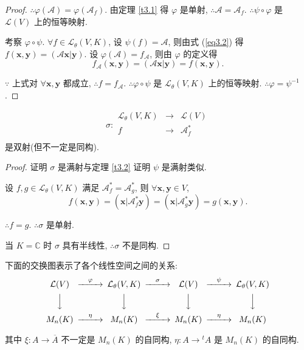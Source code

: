 \documentclass{ctexart}
\begin{document}
\begin{proof}
    $\therefore\varphi(\mathcal{A})=\varphi(\mathcal{A}_f)$. 由定理 \ref{t3.1} 得 $\varphi$ 是单射, $\therefore\mathcal{A}=\mathcal{A}_f$. $\therefore\psi\circ\varphi$ 是 $\mathcal{L}(V)$ 上的恒等映射.
    
    考察 $\varphi\circ\psi$. $\forall f\in\mathcal{L}_\theta(V,K)$, 设 $\psi(f)=\mathcal{A}$, 则由式 (\ref{eq3.2}) 得 $f(\boldsymbol{x},\boldsymbol{y})=(\mathcal{A}\boldsymbol{x}|\boldsymbol{y})$. 设 $\varphi(\mathcal{A})=f_\mathcal{A}$, 则由 $\varphi$ 的定义得
    \[f_\mathcal{A}(\boldsymbol{x},\boldsymbol{y})=(\mathcal{A}\boldsymbol{x}|\boldsymbol{y})=f(\boldsymbol{x},\boldsymbol{y}).\]
    
    $\because$ 上式对 $\forall\boldsymbol{x},\boldsymbol{y}$ 都成立, $\therefore f=f_\mathcal{A}$. $\therefore\varphi\circ\psi$ 是 $\mathcal{L}_\theta(V,K)$ 上的恒等映射. $\therefore\varphi=\psi^{-1}$.
\end{proof}
\begin{theorem}
    \[\sigma:\begin{array}{rcl}
        \mathcal{L}_\theta(V,K) & \to & \mathcal{L}(V) \\
        f & \to & \mathcal{A}^*_f \\
    \end{array}\]
    是双射(但不一定是同构).
\end{theorem}
\begin{proof}
    证明 $\sigma$ 是满射与定理 \ref{t3.2} 证明 $\psi$ 是满射类似.

    设 $f,g\in\mathcal{L}_\theta(V,K)$ 满足 $\mathcal{A}^*_f=\mathcal{A}^*_g$, 则 $\forall\boldsymbol{x},\boldsymbol{y}\in V$,
    \[f(\boldsymbol{x},\boldsymbol{y})=(\boldsymbol{x}|\mathcal{A}^*_f\boldsymbol{y})=(\boldsymbol{x}|\mathcal{A}^*_g\boldsymbol{y})=g(\boldsymbol{x},\boldsymbol{y}).\]

    $\therefore f=g$. $\therefore\sigma$ 是单射.

    当 $K=\mathbb{C}$ 时 $\sigma$ 具有半线性, $\therefore\sigma$ 不是同构.
\end{proof}
下面的交换图表示了各个线性空间之间的关系:
\[\begin{CD}
    \mathcal{L}(V) @>\varphi>> \mathcal{L}_\theta(V,K) @>\sigma>> \mathcal{L}(V) @>\psi>> \mathcal{L}_\theta(V,K) \\
    @VVV @VVV @VVV @VVV \\
    M_n(K) @>\eta>> M_n(K) @>\xi>> M_n(K) @>\eta>> M_n(K)
\end{CD}\]

其中 $\xi:A\to\overline{A}$ 不一定是 $M_n(K)$ 的自同构, $\eta:A\to{}^tA$ 是 $M_n(K)$ 的自同构.
\end{document}
